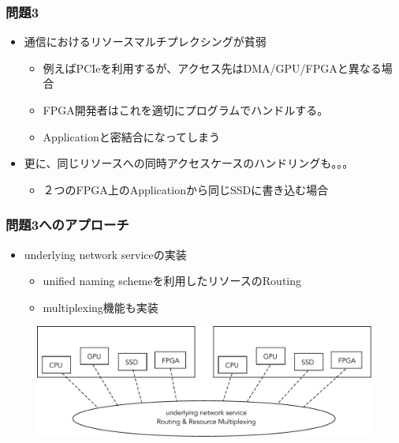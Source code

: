 \documentclass[dvipdfmx,9pt,notheorems]{beamer}
\theoremstyle{definition}
\begin{document}
\begin{frame}\frametitle{問題3}
	\begin{itemize}
		\item 通信におけるリソースマルチプレクシングが貧弱
			\begin{itemize}
				\item 例えばPCIeを利用するが、アクセス先はDMA/GPU/FPGAと異なる場合
				\item FPGA開発者はこれを適切にプログラムでハンドルする。
				\item Applicationと密結合になってしまう
			\end{itemize}
		\item 更に、同じリソースへの同時アクセスケースのハンドリングも。。。
			\begin{itemize}
				\item ２つのFPGA上のApplicationから同じSSDに書き込む場合
			\end{itemize}
	\end{itemize}
	\pnote{
	}
\end{frame}

\begin{frame}\frametitle{問題3へのアプローチ}
	\begin{itemize}
		\item underlying network serviceの実装
		\begin{itemize}
		  \item unified naming schemeを利用したリソースのRouting
			\item multiplexing機能も実装
		\end{itemize}
	\end{itemize}
  \begin{figure}[htb]
		\includegraphics[width=\linewidth]{fig/ez_FPGA_mux_routing.pdf}
  \end{figure}
	\pnote{
	}
\end{frame}
\end{document}
